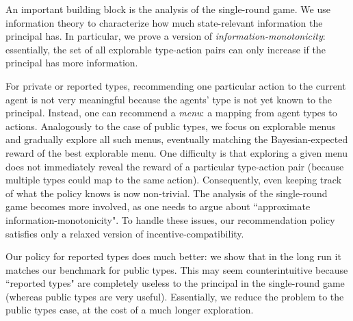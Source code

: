 An important building block is the analysis of the single-round game. We use information theory to characterize how much state-relevant information the principal has. In particular, we prove a version of \emph{information-monotonicity}: essentially, the set of all explorable type-action pairs can only increase if the principal has more information.


For private or reported types, recommending one particular action to the current agent is not very meaningful because the agents' type is not yet known to the principal. Instead, one can recommend a \emph{menu}: a mapping from agent types to actions. Analogously to the case of public types, we focus on explorable menus and gradually explore all such menus, eventually matching the Bayesian-expected reward of the best explorable menu.
%
%
One difficulty is that exploring a given menu does not immediately reveal the reward of a particular type-action pair (because multiple types could map to the same action). Consequently, even keeping track of what the policy knows is now non-trivial. The analysis of the single-round game becomes more involved, as one needs to argue about ``approximate information-monotonicity". To handle these issues, our recommendation policy satisfies only a relaxed version of incentive-compatibility.

Our policy for reported types does much better: we show that in the long run it matches our benchmark for public types. This may seem counterintuitive because ``reported types" are completely useless to the principal in the single-round game (whereas public types are very useful). Essentially, we reduce the problem to the public types case, at the cost of a much longer exploration.


